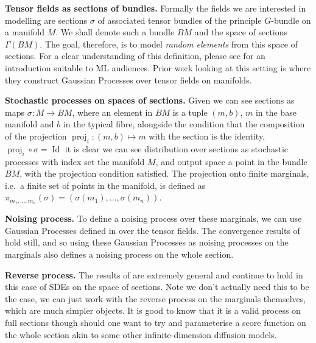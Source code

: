 \textbf{Tensor fields as sections of bundles.}
Formally the fields we are interested in modelling are sections $\sigma$ of associated tensor bundles of the principle $G$-bundle on a manifold $M$.
We shall denote such a bundle $BM$ and the space of sections $\Gamma(BM)$.
The goal, therefore, is to model \textit{random elements} from this space of sections.
For a clear understanding of this definition, please see \textcite[pages 73-95]{weiler2021coordinate} for an introduction suitable to ML audiences.
Prior work looking at this setting is \cite{hutchinson2021vector} where they construct Gaussian Processes over tensor fields on manifolds.

\textbf{Stochastic processes on spaces of sections.}
Given we can see sections as maps $\sigma: M \to BM$, where an element in $BM$ is a tuple $(m, b)$, $m$ in the base manifold and $b$ in the typical fibre, alongside the condition that the composition of the projection $\operatorname{proj}_i: (m, b)\mapsto m$ with the section is the identity, $\operatorname{proj}_i \circ \sigma = \operatorname{Id}$ it is clear we can see distribution over sections as stochastic processes with index set the manifold $M$, and output space a point in the bundle $BM$, with the projection condition satisfied.
The projection onto finite marginals, i.e.\ a finite set of points in the manifold, is defined as $\pi_{m_1, .
		.., m_n}(\sigma) = (\sigma(m_1), ..., \sigma(m_n))$.

\textbf{Noising process.}
To define a noising process over these marginals, we can use Gaussian Processes defined in \cite{hutchinson2021vector} over the tensor fields.
The convergence results of \textcite{phillips2022spectral} hold still, and so using these Gaussian Processes as noising processes on the marginals also defines a noising process on the whole section.

\textbf{Reverse process.}
The results of \cite{cattiaux2021time} are extremely general and continue to hold in this case of SDEs on the space of sections.
Note we don't actually need this to be the case, we can just work with the reverse process on the marginals themselves, which are much simpler objects.
It is good to know that it is a valid process on full sections though should one want to try and parameterise a score function on the whole section akin to some other infinite-dimension diffusion models.

